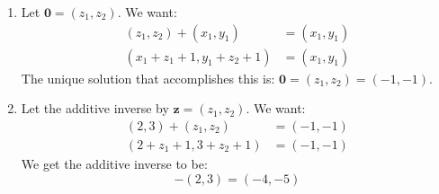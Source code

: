 \begin{sol}
\begin{enumerate}[label=\textbf{(\alph*)}]
    \item Let $\bm{0} = (z_1,z_2)$. We want:
    \begin{align}
        (z_1,z_2) + (x_1,y_1) &= (x_1,y_1) \\ 
        (x_1+z_1+1, y_1+z_2+1) &= (x_1,y_1) 
    \end{align}
    The unique solution that accomplishes this is: $\bm{0} = (z_1,z_2) = (-1,-1)$.
    \item Let the additive inverse by $\bm{z}=(z_1,z_2)$. We want:
    \begin{align}
        (2,3) + (z_1,z_2) &= (-1,-1) \\ 
        (2+z_1+1,3+z_2+1) &= (-1,-1) 
    \end{align}
    We get the additive inverse to be:
    \begin{equation}
        -(2,3) = (-4,-5)
    \end{equation}
\end{enumerate}

\end{sol}